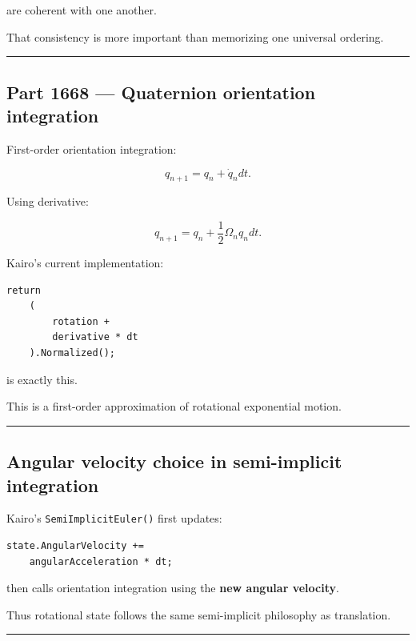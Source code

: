 are coherent with one another.

That consistency is more important than memorizing one universal ordering.

\begin{center}\rule{0.5\linewidth}{0.5pt}\end{center}

\subsection{Part 1668 --- Quaternion orientation integration}\label{06-engine-ii-ch037-part-1668-quaternion-orientation-integration}

First-order orientation integration:

\[
q_{n+1}
=
q_n+
\dot q_n dt.
\]

Using derivative:

\[
\boxed{
q_{n+1}
=
q_n+
\frac12
\Omega_n q_n dt.
}
\]

Kairo's current implementation:

\begin{verbatim}
return
    (
        rotation +
        derivative * dt
    ).Normalized();
\end{verbatim}

is exactly this.

This is a first-order approximation of rotational exponential motion.

\begin{center}\rule{0.5\linewidth}{0.5pt}\end{center}

\subsection{Angular velocity choice in semi-implicit integration}\label{06-engine-ii-ch037-angular-velocity-choice-in-semi-implicit-integration}

Kairo's \texttt{SemiImplicitEuler()} first updates:

\begin{verbatim}
state.AngularVelocity +=
    angularAcceleration * dt;
\end{verbatim}

then calls orientation integration using the \textbf{new angular velocity}.

Thus rotational state follows the same semi-implicit philosophy as translation.

\begin{center}\rule{0.5\linewidth}{0.5pt}\end{center}

